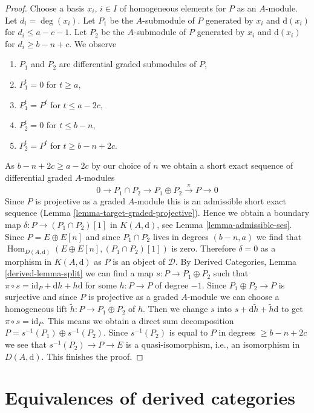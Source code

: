 \documentclass{stacks-project}
\theoremstyle{plain}
\theoremstyle{definition}
\theoremstyle{remark}
\numberwithin{equation}{subsection}
\def\Hom{\mathop{\mathrm{Hom}}\nolimits}
\begin{document}
\begin{proof}
\medskip\noindent
Choose a basis $x_i$, $i \in I$ of homogeneous elements for $P$ as an
$A$-module. Let $d_i = \deg(x_i)$.
Let $P_1$ be the $A$-submodule of $P$ generated by $x_i$ and
$\text{d}(x_i)$ for $d_i \leq a - c - 1$.
Let $P_2$ be the $A$-submodule of $P$ generated by $x_i$ and
$\text{d}(x_i)$ for $d_i \geq b - n + c$.
We observe
\begin{enumerate}
\item $P_1$ and $P_2$ are differential graded submodules of $P$,
\item $P_1^t = 0$ for $t \geq a$,
\item $P_1^t = P^t$ for $t \leq a - 2c$,
\item $P_2^t = 0$ for $t \leq b - n$,
\item $P_2^t = P^t$ for $t \geq b - n + 2c$.
\end{enumerate}
As $b - n + 2c \geq a - 2c$ by our choice of $n$
we obtain a short exact sequence of differential graded $A$-modules
$$
0 \to P_1 \cap P_2 \to P_1 \oplus P_2 \xrightarrow{\pi} P \to 0
$$
Since $P$ is projective as a graded $A$-module this is an admissible
short exact sequence (Lemma \ref{lemma-target-graded-projective}).
Hence we obtain a boundary map
$\delta : P \to (P_1 \cap P_2)[1]$ in $K(A, \text{d})$, see
Lemma \ref{lemma-admissible-ses}.
Since $P = E \oplus E[n]$ and since $P_1 \cap P_2$ lives in
degrees $(b - n, a)$ we find that
$\Hom_{D(A, \text{d})}(E \oplus E[n], (P_1 \cap P_2)[1])$ is
zero. Therefore $\delta = 0$ as a morphism in $K(A, \text{d})$
as $P$ is an object of $\mathcal{D}$.
By Derived Categories, Lemma \ref{derived-lemma-split}
we can find a map $s : P \to P_1 \oplus P_2$ such that
$\pi \circ s = \text{id}_P + \text{d}h + h\text{d}$ for some $h : P \to P$
of degree $-1$. Since $P_1 \oplus P_2 \to P$ is surjective and since $P$
is projective as a graded $A$-module we can choose a homogeneous
lift $\tilde h : P \to P_1 \oplus P_2$ of $h$. Then we change
$s$ into $s + \text{d} \tilde h + \tilde h \text{d}$ to get
$\pi \circ s = \text{id}_P$. This means we obtain a direct
sum decomposition $P = s^{-1}(P_1) \oplus s^{-1}(P_2)$.
Since $s^{-1}(P_2)$ is equal to $P$ in degrees $\geq b - n + 2c$
we see that $s^{-1}(P_2) \to P \to E$ is a quasi-isomorphism,
i.e., an isomorphism in $D(A, \text{d})$. This finishes the proof.
\end{proof}








\section{Equivalences of derived categories}
\label{section-equivalence}
\end{document}
